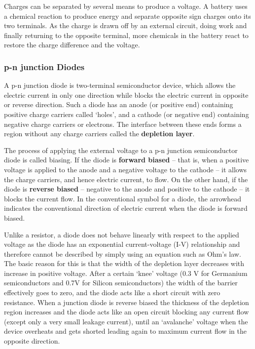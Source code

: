 Charges can be separated by several means to produce a voltage. A battery uses a chemical reaction to produce energy and separate opposite sign charges onto its two terminals. As the charge is drawn off by an external circuit, doing work and finally returning to the opposite terminal, more chemicals in the battery react to restore the charge difference and the voltage.


\subsubsection*{p-n junction Diodes}

A p-n junction diode is two-terminal semiconductor device, which allows the electric current in only one direction while blocks the electric current in opposite or reverse direction. Such a diode has an anode (or positive end) containing positive charge carriers called `holes', and a cathode (or negative end) containing negative charge carriers or electrons. The interface between these ends forms a region without any charge carriers called the \textbf{depletion layer}. 

The process of applying the external voltage to a p-n junction semiconductor diode is called biasing. If the diode is \textbf{forward biased} -- that is, when a positive voltage is applied to the anode and a negative voltage to the cathode -- it allows the charge carriers, and hence electric current, to flow. On the other hand, if the diode is \textbf{reverse biased} -- negative to the anode and positive to the cathode -- it blocks the current flow. In the conventional symbol for a diode, the arrowhead indicates the conventional direction of electric current when the diode is forward biased.

Unlike a resistor, a diode does not behave linearly with respect to the applied voltage as the diode has an exponential current-voltage (I-V) relationship and therefore cannot be described by simply using an equation such as Ohm’s law. The basic reason for this is that the width of the depletion layer decreases with increase in positive voltage. After a certain `knee' voltage (0.3 V for Germanium semiconductors and 0.7V for Silicon semiconductors) the width of the barrier effectively goes to zero, and the diode acts like a short circuit with zero resistance. When a junction diode is reverse biased the thickness of the depletion region increases and the diode acts like an open circuit blocking any current flow (except only a very small leakage current), until an `avalanche' voltage when the device overheats and gets shorted leading again to maximum current flow in the opposite direction.

